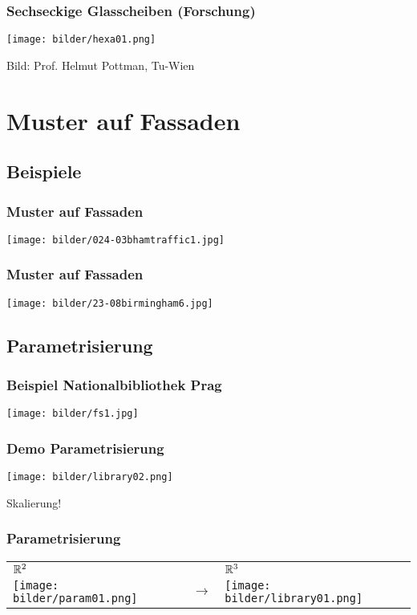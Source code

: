\documentclass[12pt]{beamer}
\begin{document}
\begin{frame}
\frametitle{Sechseckige Glasscheiben (Forschung)}
\begin{center}
\texttt{[image: bilder/hexa01.png]}
\end{center}
\tiny{Bild: Prof. Helmut Pottman, Tu-Wien}
\end{frame}




\section{Muster auf Fassaden}

\subsection{Beispiele}

\begin{frame}
	\frametitle{Muster auf Fassaden}
	\texttt{[image: bilder/024-03bhamtraffic1.jpg]}
\end{frame}

\begin{frame}
	\frametitle{Muster auf Fassaden}
	\begin{center}
	\texttt{[image: bilder/23-08birmingham6.jpg]}
	\end{center}
\end{frame}

\subsection{Parametrisierung}

\begin{frame}
\frametitle{Beispiel Nationalbibliothek Prag}
	\begin{center}
	\texttt{[image: bilder/fs1.jpg]}
	\end{center}
\end{frame}

\begin{frame}
\frametitle{Demo Parametrisierung}
	\begin{center}
	\texttt{[image: bilder/library02.png]}
	\end{center}
	\tiny{Skalierung!}
\end{frame}



\begin{frame}
	\frametitle{Parametrisierung}
	\begin{center}
	\begin{tabular}{m{5.5cm}m{0.5cm}m{5.5cm}}
	$\Bbb R^2$ & & $\Bbb R^3$ \\
	\texttt{[image: bilder/param01.png]} & $\to$ & \texttt{[image: bilder/library01.png]} \\
	\end{tabular}
	\end{center}
\end{frame}
\end{document}
